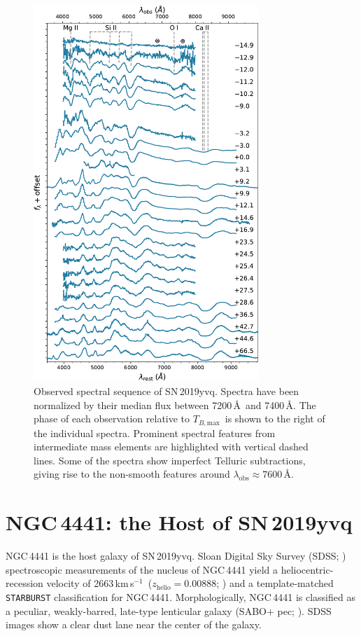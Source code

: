 \documentclass[twocolumn]{aastex63}
\newcommand{\tbmax}{$T_{B,\mathrm{max}}$}
\newcommand{\kms}{km\,s$^{-1}$}
\newcommand{\sn}{SN\,2019yvq}
\begin{document}


\begin{figure}
    \centering
    \includegraphics[width=3.35in]{./figures/spec_evo.pdf}
    \caption{Observed spectral sequence of \sn. Spectra have been normalized
    by their median flux between 7200\,\AA\ and 7400\,\AA. The phase of each
    observation relative to \tbmax\ is shown to the right of the individual
    spectra. Prominent spectral features from intermediate mass elements are
    highlighted with vertical dashed lines. Some of the spectra show
    imperfect Telluric subtractions, giving rise to the non-smooth features
    around $\lambda_\mathrm{obs} \approx 7600$\,\AA.}
    \label{fig:spec_evo}
\end{figure}

\section{NGC\,4441: the Host of \sn}\label{sec:host}

NGC\,4441 is the host galaxy of \sn. Sloan Digital Sky Survey (SDSS;
\citealt{York00}) spectroscopic measurements of the nucleus of NGC\,4441 yield
a heliocentric-recession velocity of 2663\,\kms\ ($z_\mathrm{helio} =
0.00888$; \citealt{Abolfathi18}) and a template-matched \texttt{STARBURST}
classification for NGC\,4441. Morphologically, NGC\,4441 is classified as a
peculiar, weakly-barred, late-type lenticular galaxy (SABO$+$ pec;
\citealt{de-Vaucouleurs91}). SDSS images show a clear dust lane near the
center of the galaxy.
\end{document}
